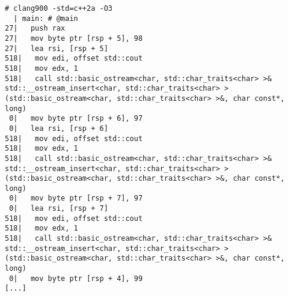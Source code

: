 \begin{lstlisting}[language={},numbers=none,title=\href{https://godbolt.org/z/VAx-cK}{\texttt{godbolt.org/z/VAx-cK}}]
# clang900 -std=c++2a -O3
  | main: # @main
27|   push rax
27|   mov byte ptr [rsp + 5], 98
27|   lea rsi, [rsp + 5]
518|   mov edi, offset std::cout
518|   mov edx, 1
518|   call std::basic_ostream<char, std::char_traits<char> >& std::__ostream_insert<char, std::char_traits<char> >(std::basic_ostream<char, std::char_traits<char> >&, char const*, long)
 0|   mov byte ptr [rsp + 6], 97
 0|   lea rsi, [rsp + 6]
518|   mov edi, offset std::cout
518|   mov edx, 1
518|   call std::basic_ostream<char, std::char_traits<char> >& std::__ostream_insert<char, std::char_traits<char> >(std::basic_ostream<char, std::char_traits<char> >&, char const*, long)
 0|   mov byte ptr [rsp + 7], 97
 0|   lea rsi, [rsp + 7]
518|   mov edi, offset std::cout
518|   mov edx, 1
518|   call std::basic_ostream<char, std::char_traits<char> >& std::__ostream_insert<char, std::char_traits<char> >(std::basic_ostream<char, std::char_traits<char> >&, char const*, long)
 0|   mov byte ptr [rsp + 4], 99
[...]
\end{lstlisting}
